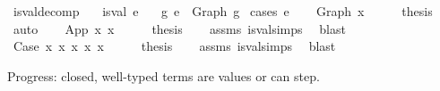 \begin{isabellebody}
%
\endisadelimproof
\isanewline
\isanewline
{}\isamarkupfalse%
\ is{\isacharunderscore}{\kern0pt}val{\isacharunderscore}{\kern0pt}decomp{\isacharcolon}{\kern0pt}\isanewline
\ \ \ {\isachardoublequoteopen}is{\isacharunderscore}{\kern0pt}val\ e{\isachardoublequoteclose}\isanewline
\ \ \ {\isachardoublequoteopen}{\isasymexists}g{\isachardot}{\kern0pt}\ e\ {\isacharequal}{\kern0pt}\ Graph\ g{\isachardoublequoteclose}\isanewline
%
\isadelimproof
%
\endisadelimproof
%
\isatagproof
{}\isamarkupfalse%
\ {\isacharparenleft}{\kern0pt}cases\ e{\isacharparenright}{\kern0pt}\isanewline
\ \ \isamarkupfalse%
\ {\isacharparenleft}{\kern0pt}Graph\ x{}{\isacharparenright}{\kern0pt}\isanewline
\ \ \isamarkupfalse%
\ \isamarkupfalse%
\ {\isacharquery}{\kern0pt}thesis\isanewline
\ \ \isamarkupfalse%
\ auto\isanewline
{}\isamarkupfalse%
\isanewline
\ \ \isamarkupfalse%
\ {\isacharparenleft}{\kern0pt}App\ x{}{}\ x{}{}{\isacharparenright}{\kern0pt}\isanewline
\ \ \isamarkupfalse%
\ \isamarkupfalse%
\ {\isacharquery}{\kern0pt}thesis\isanewline
\ \ \isamarkupfalse%
\ assms\ is{\isacharunderscore}{\kern0pt}val{\isachardot}{\kern0pt}simps{\isacharparenleft}{\kern0pt}{}{\isacharparenright}{\kern0pt}\ \isamarkupfalse%
\ blast\isanewline
{}\isamarkupfalse%
\isanewline
\ \ \isamarkupfalse%
\ {\isacharparenleft}{\kern0pt}Case\ x{}{}\ x{}{}\ x{}{}\ x{}{}\ x{}{}{\isacharparenright}{\kern0pt}\isanewline
\ \ \isamarkupfalse%
\ \isamarkupfalse%
\ {\isacharquery}{\kern0pt}thesis\isanewline
\ \ \isamarkupfalse%
\ assms\ is{\isacharunderscore}{\kern0pt}val{\isachardot}{\kern0pt}simps{\isacharparenleft}{\kern0pt}{}{\isacharparenright}{\kern0pt}\ \isamarkupfalse%
\ blast\isanewline
{}\isamarkupfalse%
%
\endisatagproof
{\isafoldproof}%
%
\isadelimproof
%
\endisadelimproof
%
\begin{isamarkuptext}%
Progress: closed, well-typed terms are values or can step.%
\end{isamarkuptext}\isamarkuptrue%
\isamarkupfalse%

\end{isabellebody}
